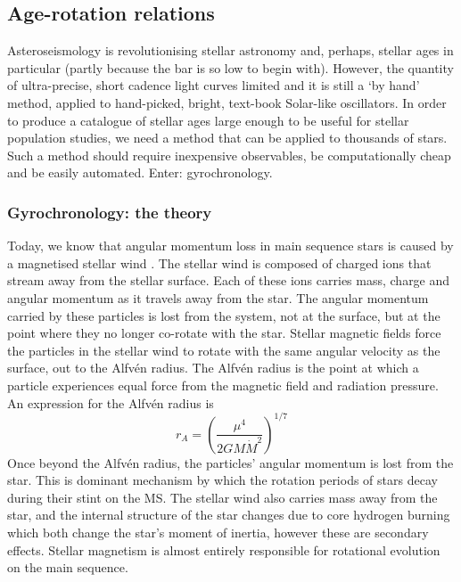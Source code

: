 \subsection{Age-rotation relations}

Asteroseismology is revolutionising stellar astronomy and, perhaps, stellar
ages in particular (partly because the bar is so low to begin with).
However, the quantity of ultra-precise, short cadence light curves limited and
it is still a `by hand' method, applied to hand-picked, bright, text-book
Solar-like oscillators.
In order to produce a catalogue of stellar ages large enough to be useful for
stellar population studies, we need a method that can be applied to thousands
of stars.
Such a method should require inexpensive observables, be computationally cheap
and be easily automated.
Enter: gyrochronology.

\subsubsection{Gyrochronology: the theory}

Today, we know that angular momentum loss in main sequence stars is caused by
a magnetised stellar wind \citep{Schatzman1962, Weber1967, Mestel1984}.
The stellar wind is composed of charged ions that stream away from the stellar
surface.
Each of these ions carries mass, charge and angular momentum as it travels
away from the star.
The angular momentum carried by these particles is lost from the system, not
at the surface, but at the point where they no longer co-rotate with the star.
Stellar magnetic fields force the particles in the stellar wind to rotate with
the same angular velocity as the surface, out to the Alfv{\'e}n radius.
The Alfv{\'e}n radius is the point at which a particle experiences equal force
from the magnetic field and radiation pressure.
An expression for the Alfv{\'e}n radius is \citep{Rosswog2011}
\begin{equation}
r_A = \left( \frac{\mu^4}{2GM\dot{M}^2} \right)^{1/7}
\end{equation}
Once beyond the Alfv{\'e}n radius, the particles' angular momentum is lost
from the star.
This is dominant mechanism by which the rotation periods of stars decay during
their stint on the MS.
The stellar wind also carries mass away from the star, and the internal
structure of the star changes due to core hydrogen burning which both change
the star's moment of inertia, however these are secondary effects.
Stellar magnetism is almost entirely responsible for rotational evolution on
the main sequence.


